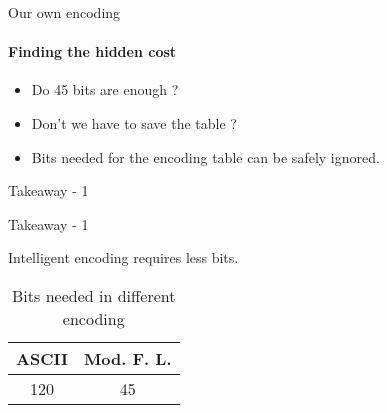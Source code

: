 \begin{frame}{Our own encoding}
\framesubtitle{Finding the hidden cost}
    \begin{itemize}
        \item Do 45 bits are enough ? \pause
        \item Don't we have to save the table ?\pause
        \item Bits needed for the encoding table can be safely ignored.
    \end{itemize}
\end{frame}
\begin{frame}{Takeaway - 1}

\begin{block}{\centering Takeaway - 1}

\centering 
    Intelligent encoding requires less bits.
\end{block}
\begin{table}[]
    \centering
    \begin{tabular}{|c|c|}
    \hline
        ASCII  & Mod. F. L. \\\hline
         120 & 45 \\ \hline 
    \end{tabular}
    \caption{Bits needed in different encoding}
\end{table}    
\end{frame}
